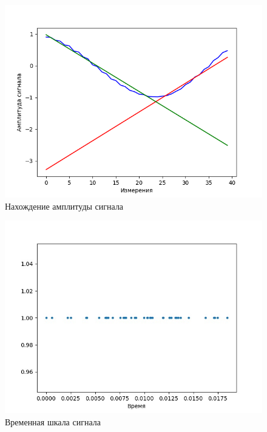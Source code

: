 \documentclass[12pt,a4paper]{article}
\begin{document}
\begin{figure}[H]
    \centering
    \includegraphics[scale=0.8]{images/amlitude.png}
    \caption{Нахождение амплитуды сигнала}
\end{figure}

\begin{figure}[H]
    \centering
    \includegraphics[scale=0.6]{images/time.jpg}
    \caption{Временная шкала сигнала}
\end{figure}
\end{document}
